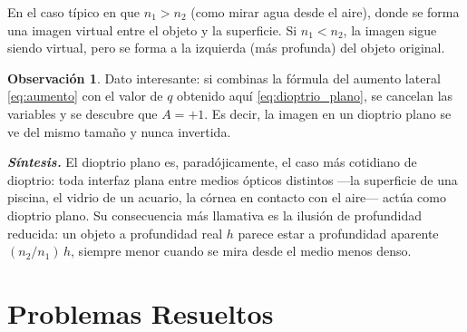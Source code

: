 \documentclass[12pt, a4paper]{article}
\theoremstyle{definition}
\newtheorem{observacion}{Observación}[section]
\begin{document}
En el caso típico en que \(n_1 > n_2\) (como mirar agua desde el aire), donde se forma una
imagen virtual entre el objeto y la superficie. Si \(n_1 < n_2\), la imagen sigue siendo
virtual, pero se forma a la izquierda (más profunda) del objeto original.

\begin{observacion}
Dato interesante: si combinas la fórmula del aumento lateral \eqref{eq:aumento} con el
valor de \(q\) obtenido aquí \eqref{eq:dioptrio_plano}, se cancelan las variables y se
descubre que \(A = +1\). Es decir, la imagen en un dioptrio plano se ve del mismo tamaño
y nunca invertida.
\end{observacion}

\textit{\textbf{Síntesis.}} El dioptrio plano es, paradójicamente, el caso más cotidiano
de dioptrio: toda interfaz plana entre medios ópticos distintos —la superficie de una
piscina, el vidrio de un acuario, la córnea en contacto con el aire— actúa como dioptrio
plano. Su consecuencia más llamativa es la ilusión de profundidad reducida: un objeto a
profundidad real \(h\) parece estar a profundidad aparente \((n_2/n_1)\,h\), siempre menor
cuando se mira desde el medio menos denso.

\section{Problemas Resueltos}
\end{document}

